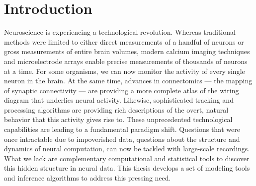 \chapter{Introduction}
\label{introduction}


Neuroscience is experiencing a technological revolution. Whereas
traditional methods were limited to either direct measurements of a
handful of neurons or gross measurements of
entire brain volumes, modern calcium imaging techniques and
microelectrode arrays enable precise measurements of thousands of
neurons at a time. For some organisms, we can now monitor the activity
of every single neuron in the brain.
At the same time, advances in connectomics --- the
mapping of synaptic connectivity --- are providing a
more complete atlas of the wiring diagram that underlies neural
activity.  Likewise, sophisticated tracking and processing algorithms
are providing rich descriptions of the overt, natural behavior that
this activity gives rise to.  These unprecedented technological
capabilities are leading to a fundamental paradigm shift.
Questions that were once intractable due to impoverished data,
questions about the structure and dynamics of neural computation,
can now be tackled with large-scale recordings.
What we lack are complementary computational and statistical tools to
discover this hidden structure in neural data.  This thesis develops a
set of modeling tools and inference algorithms to address this
pressing need.


